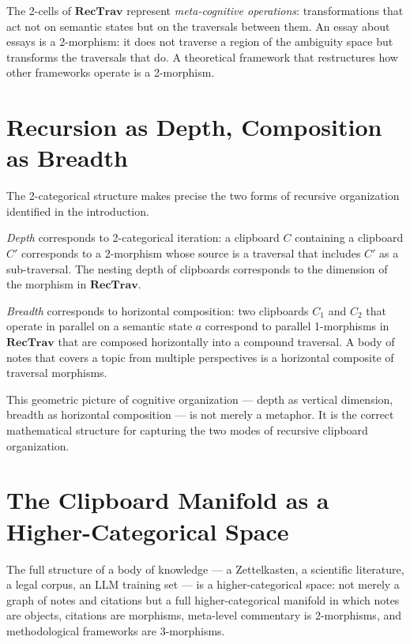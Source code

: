 \documentclass[12pt,oneside]{book}
\theoremstyle{plain}
\theoremstyle{definition}
\theoremstyle{plain}
\newcommand{\RecTrav}{\mathbf{RecTrav}}
\begin{document}
The 2-cells of $\RecTrav$ represent \emph{meta-cognitive operations}: transformations that act not on semantic states but on the traversals between them. An essay about essays is a 2-morphism: it does not traverse a region of the ambiguity space but transforms the traversals that do. A theoretical framework that restructures how other frameworks operate is a 2-morphism.

\section{Recursion as Depth, Composition as Breadth}

The 2-categorical structure makes precise the two forms of recursive organization identified in the introduction.

\emph{Depth} corresponds to 2-categorical iteration: a clipboard $C$ containing a clipboard $C'$ corresponds to a 2-morphism whose source is a traversal that includes $C'$ as a sub-traversal. The nesting depth of clipboards corresponds to the dimension of the morphism in $\RecTrav$.

\emph{Breadth} corresponds to horizontal composition: two clipboards $C_1$ and $C_2$ that operate in parallel on a semantic state $a$ correspond to parallel 1-morphisms in $\RecTrav$ that are composed horizontally into a compound traversal. A body of notes that covers a topic from multiple perspectives is a horizontal composite of traversal morphisms.

This geometric picture of cognitive organization — depth as vertical dimension, breadth as horizontal composition — is not merely a metaphor. It is the correct mathematical structure for capturing the two modes of recursive clipboard organization.

\section{The Clipboard Manifold as a Higher-Categorical Space}

The full structure of a body of knowledge — a Zettelkasten, a scientific literature, a legal corpus, an LLM training set — is a higher-categorical space: not merely a graph of notes and citations but a full higher-categorical manifold in which notes are objects, citations are morphisms, meta-level commentary is 2-morphisms, and methodological frameworks are 3-morphisms.
\end{document}
